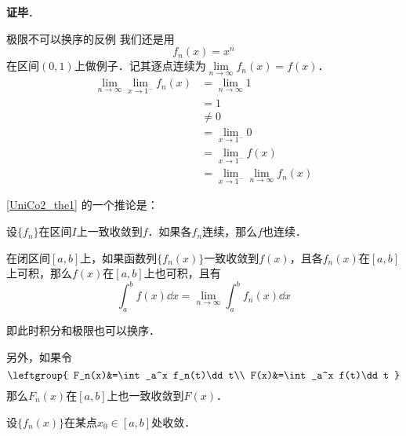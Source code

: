 \textbf{证毕}．



\begin{example}{极限不可以换序的反例}
我们还是用
\begin{equation}
f_n(x)=x^n
\end{equation}
在区间$(0, 1)$上做例子．记其逐点连续为$\lim\limits_{n\to\infty}f_n(x)=f(x)$．
\begin{equation}
\begin{aligned}
\lim\limits_{n\to\infty}\lim\limits_{x\to 1^-}f_n(x)&=\lim\limits_{n\to\infty}1\\
&=1\\
&\not=0\\
&=\lim\limits_{x\to 1^-} 0\\
&=\lim\limits_{x\to 1^-}f(x)\\
&=\lim\limits_{x\to 1^-}\lim\limits_{n\to\infty}f_n(x)
\end{aligned}
\end{equation}
\end{example}

\autoref{UniCo2_the1} 的一个推论是：
\begin{corollary}{}
设$\{f_n\}$在区间$I$上一致收敛到$f$．如果各$f_n$连续，那么$f$也连续．
\end{corollary}

\begin{theorem}{}
在闭区间$[a, b]$上，如果函数列$\{f_n(x)\}$一致收敛到$f(x)$，且各$f_n(x)$在$[a, b]$上可积，那么$f(x)$在$[a, b]$上也可积，且有
\begin{equation}
\int_a^b f(x) \dd x=\lim_{n\to\infty}\int_a^b f_n(x)\dd x
\end{equation}

即此时积分和极限也可以换序．

另外，如果令
\begin{equation}
\leftgroup{
    F_n(x)&=\int_a^x f_n(t)\dd t\\
    F(x)&=\int_a^x f(t)\dd t
}
\end{equation}
那么$F_n(x)$在$[a, b]$上也一致收敛到$F(x)$．

\end{theorem}

\begin{theorem}{}
设$\{f_n(x)\}$在某点$x_0\in [a, b]$处收敛．
\end{theorem}

















